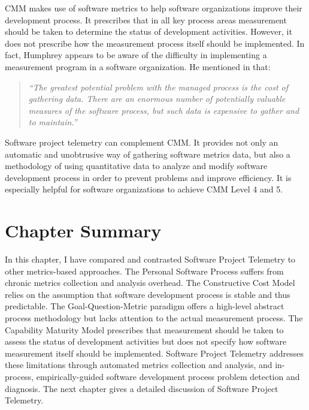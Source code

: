 CMM makes use of software metrics to help software organizations improve their development process. It prescribes that in all key process areas measurement should be taken to determine the status of development activities. However, it does not prescribe how the measurement process itself should be implemented. In fact, Humphrey appears to be aware of the difficulty in implementing a measurement program in a software organization. He mentioned in \cite{SEI:1995} that:

\begin{quote}
\textit{``The greatest potential problem with the managed process is the cost of gathering data. There are an enormous number of potentially valuable measures of the software process, but such data is expensive to gather and to maintain.''}
\end{quote}
 
Software project telemetry can complement CMM. It provides not only an automatic and unobtrusive way of gathering software metrics data, but also a methodology of using quantitative data to analyze and modify software development process in order to prevent problems and improve efficiency. It is especially helpful for software organizations to achieve CMM Level 4 and 5.











\section{Chapter Summary}  \label{RelatedWork:Summary}

In this chapter, I have compared and contrasted Software Project Telemetry to other metrics-based approaches. The Personal Software Process suffers from chronic metrics collection and analysis overhead. The Constructive Cost Model relies on the assumption that software development process is stable and thus predictable. The Goal-Question-Metric paradigm offers a high-level abstract process methodology but lacks attention to the actual measurement process. The Capability Maturity Model prescribes that measurement should be taken to assess the status of development activities but does not specify how software measurement itself should be implemented. Software Project Telemetry addresses these limitations through automated metrics collection and analysis, and in-process, empirically-guided software development process problem detection and diagnosis. The next chapter gives a detailed discussion of Software Project Telemetry.

